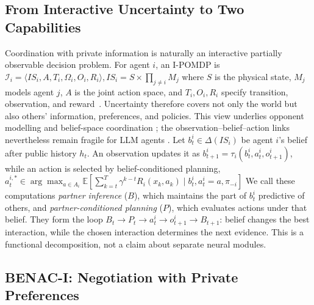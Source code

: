 \subsection{From Interactive Uncertainty to Two Capabilities}
\label{sec:coordination-formulation}

Coordination with private information is naturally an interactive partially
observable decision problem.  For agent $i$, an I-POMDP is $\mathcal I_i=\langle IS_i,A,T_i,\Omega_i,O_i,R_i\rangle, IS_i=S\times\prod_{j\neq i}M_j$
where $S$ is the physical state, $M_j$ models agent $j$, $A$ is the joint
action space, and $T_i,O_i,R_i$ specify transition, observation, and
reward~\citep{gmytrasiewicz2005ipomdp}.  Uncertainty therefore covers not only
the world but also others' information, preferences, and policies.  This view
underlies opponent modelling and belief-space coordination
\citep{carmel1996opponent,huang2024hop,goel2026bayesian}; the observation--belief--action
links nevertheless remain fragile for LLM agents
\citep{sobotka2026strategic,jha2026modeling}. 
Let $b_t^i\in\Delta(IS_i)$ be agent $i$'s belief after public history $h_t$.
An observation updates it as $b_{t+1}^i=\tau_i(b_t^i,a_t^i,o_{t+1}^i)$, while
an action is selected by belief-conditioned planning, $a_t^{i,*}\in\arg\max_{a\in A_i}\mathbb E\!\left[\sum_{k=t}^{T}\gamma^{k-t}R_i(x_k,a_k)\mid b_t^i,a_t^i=a,\pi_{-i}\right]$
We call these computations \emph{partner inference} ($B$), which maintains the
part of $b_t^i$ predictive of others, and \emph{partner-conditioned planning}
($P$), which evaluates actions under that belief.  They form the loop
$B_t\!\rightarrow P_t\!\rightarrow a_t^i\!\rightarrow o_{t+1}^i
\!\rightarrow B_{t+1}$: belief changes the best interaction, while the chosen
interaction determines the next evidence.  This is a functional decomposition,
not a claim about separate neural modules.

\subsection{BENAC-I: Negotiation with Private Preferences}
\label{sec:benac-i}

